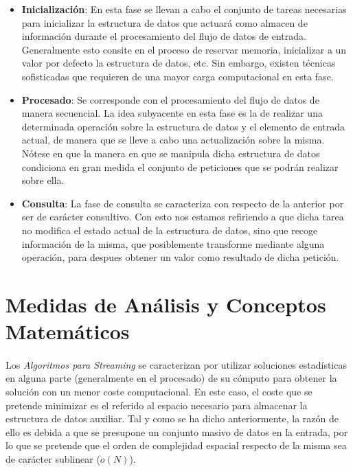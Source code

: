 \documentclass{subfiles}
\begin{document}
      \begin{itemize}

        \item \textbf{Inicialización}: En esta fase se llevan a cabo el conjunto de tareas necesarias para inicializar la estructura de datos que actuará como almacen de información durante el procesamiento del flujo de datos de entrada. Generalmente esto consite en el proceso de reservar memoria, inicializar a un valor por defecto la estructura de datos, etc. Sin embargo, existen técnicas sofisticadas que requieren de una mayor carga computacional en esta fase.

        \item \textbf{Procesado}: Se corresponde con el procesamiento del flujo de datos de manera secuencial. La idea subyacente en esta fase es la de realizar una determinada operación sobre la estructura de datos y el elemento de entrada actual, de manera que se lleve a cabo una actualización sobre la misma. Nótese en que la manera en que se manipula dicha estructura de datos condiciona en gran medida el conjunto de peticiones que se podrán realizar sobre ella.

        \item \textbf{Consulta}: La fase de consulta se caracteriza con respecto de la anterior por ser de carácter consultivo. Con esto nos estamos refiriendo a que dicha tarea no modifica el estado actual de la estructura de datos, sino que recoge información de la misma, que posiblemente transforme mediante alguna operación, para despues obtener un valor como resultado de dicha petición.

      \end{itemize}

    \section{Medidas de Análisis y Conceptos Matemáticos}
    \label{sec:streaming_analysis}

      \paragraph{}
      Los \emph{Algoritmos para Streaming} se caracterizan por utilizar soluciones estadísticas en alguna parte (generalmente en el procesado) de su cómputo para obtener la solución con un menor coste computacional. En este caso, el coste que se pretende minimizar es el referido al espacio necesario para almacenar la estructura de datos auxiliar. Tal y como se ha dicho anteriormente, la razón de ello es debida a que se presupone un conjunto masivo de datos en la entrada, por lo que se pretende que el orden de complejidad espacial respecto de la misma sea de carácter sublinear ($o(N)$).
\end{document}
